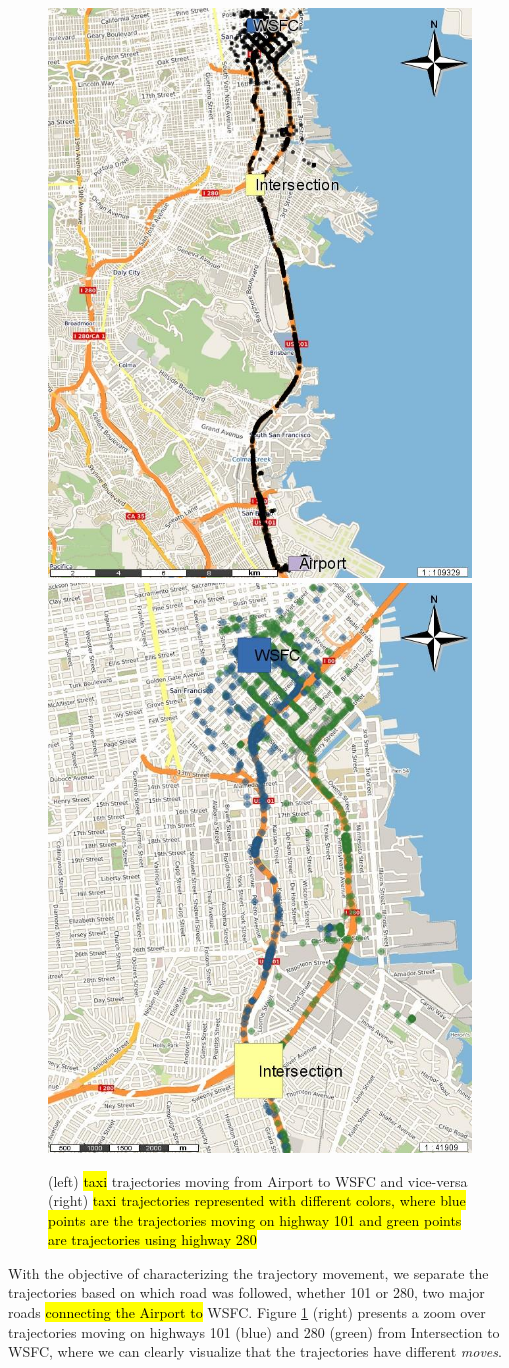 \documentclass[12pt]{article}
\begin{document}
\begin{figure}[ht!]
\centering
\includegraphics[width=.49\textwidth]{Images/CRAWDAD-Trajectories-Painted}
\includegraphics[width=.49\textwidth]{Images/CRAWDAD-Paths-Painted}
\caption{(left) \hl{taxi} trajectories moving from Airport to WSFC and vice-versa (right) \hl{taxi trajectories represented with different colors, where blue points are the trajectories moving on highway 101 and green points are trajectories using highway 280}}
\label{fig:sanfrancisco_map_rois}
\end{figure}

With the objective of characterizing the trajectory movement, we separate the trajectories based on which road was followed, whether 101 or 280, two major roads \hl{connecting the Airport to} WSFC. {Figure \ref{fig:sanfrancisco_map_rois}} (right) presents a zoom over trajectories moving on highways 101 (blue) and 280 (green) from Intersection to WSFC, where we can clearly visualize that the trajectories have different \emph{moves}.
\end{document}
